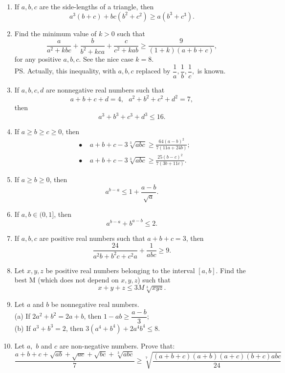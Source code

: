 \documentclass{article}
\begin{document}
\begin{enumerate}
\item If $ a,b,c$ are the side-lengths of a triangle, then
\[ a^3(b+c)+bc(b^2+c^2)\ge a(b^3+c^3).\]

\item  Find the minimum value of $ k > 0$ such that
\[ \frac  a{a^2 + kbc} + \frac  b{b^2 + kca} + \frac  c{c^2 + kab}\ge \frac  9{(1 + k)(a + b + c)},\]
for any positive $ a,b,c$. See the nice case $ k = 8$.\\
PS. Actually, this inequality, with $ a,b,c$ replaced by $ \dfrac 1{a}, \dfrac 1{b}, \dfrac 1{c},$ is known.

\item  If $ a,b,c,d$ are nonnegative real numbers such that
\[ a+b+c+d=4,\ \ \ a^2+b^2+c^2+d^2=7,\]
then
\[a^3+b^3+c^3+d^3\le 16.\]

\item  If $ a\ge b\ge c\ge 0$, then
\[\begin{aligned}& \bullet \ \ \ \ \  a+b+c-3\sqrt[3]{abc}\ge \frac  {64(a-b)^2}{7(11a+24b)};\\&\bullet  \ \ \ \ \  a+b+c-3\sqrt[3]{abc}\ge \frac  {25(b-c)^2}{7(3b+11c)}.\end{aligned}\]

\item  If $ a\ge b\ge 0$, then
\[ a^{b-a} \le 1+\frac  {a-b}{\sqrt a}.\]

\item  If $ a,b\in (0,1]$, then
\[ a^{b-a}+b^{a-b}\le 2.\]

\item  If $ a,b,c$ are positive real numbers such that $ a + b + c = 3$, then
\[ \frac  {24}{a^2b + b^2c + c^2a} + \frac  1{abc} \ge 9.\]

\item  Let $ x,y,z$ be positive real numbers belonging to the interval $ [a,b]$. Find the best M (which does not depend on $ x,y,z$) such that
\[ x+y+z\le 3M\sqrt[3] {xyz}.\]

\item  Let $ a$ and $ b$ be nonnegative real numbers.\\
(a) If $ 2a^2+b^2=2a+b$, then $ 1-ab\ge \dfrac {a-b}{3}$;\\
(b) If $ a^3+b^3=2$, then $ 3(a^4+b^4)+2a^4b^4\le 8$. \\

\item  Let $a,$ $b$ and $c$ are non-negative numbers. Prove that:
\[\frac {a+b+c+\sqrt{ab}+\sqrt{ac}+\sqrt{bc}+\sqrt[3]{abc}}{7}\geq\sqrt[7]{\frac {(a+b+c)(a+b)(a+c)(b+c)abc}{24}}\]


\end{enumerate}
\end{document}
